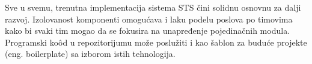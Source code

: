 \documentclass[12pt,oneside]{memoir}
\begin{document}
Sve u svemu, trenutna implementacija sistema STS čini solidnu osnovnu za dalji razvoj. Izolovanost komponenti omogućava i laku podelu poslova po timovima kako bi svaki tim mogao da se fokusira na unapređenje pojedinačnih modula. Programski ko\^{o}d u repozitorijumu može poslužiti i kao šablon za buduće projekte (eng. boilerplate) sa izborom istih tehnologija.
\literatura

\backmatter

\begin{biografija}

\end{biografija}
\end{document}
